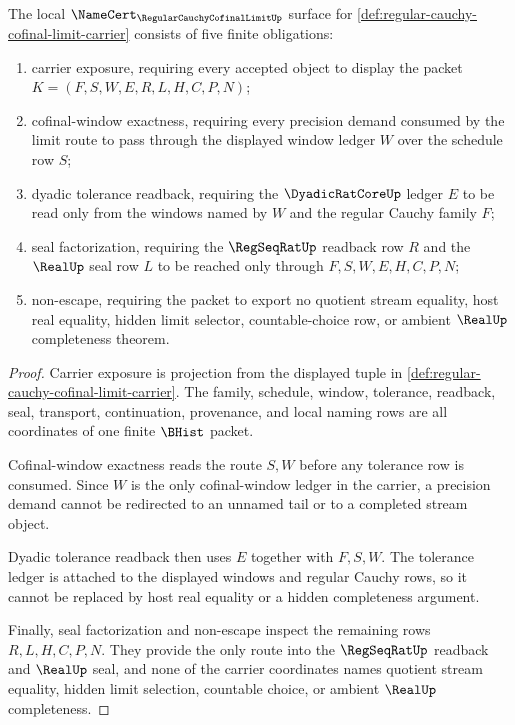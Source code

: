 \begin{theorem}
\label{thm:regular-cauchy-cofinal-limit-namecert-obligations}
The local $\NameCert_{\RegularCauchyCofinalLimitUp}$ surface for \autoref{def:regular-cauchy-cofinal-limit-carrier} consists of five finite obligations:
\begin{enumerate}
\item carrier exposure, requiring every accepted object to display the packet $K=(F,S,W,E,R,L,H,C,P,N)$;
\item cofinal-window exactness, requiring every precision demand consumed by the limit route to pass through the displayed window ledger $W$ over the schedule row $S$;
\item dyadic tolerance readback, requiring the $\DyadicRatCoreUp$ ledger $E$ to be read only from the windows named by $W$ and the regular Cauchy family $F$;
\item seal factorization, requiring the $\RegSeqRatUp$ readback row $R$ and the $\RealUp$ seal row $L$ to be reached only through $F,S,W,E,H,C,P,N$;
\item non-escape, requiring the packet to export no quotient stream equality, host real equality, hidden limit selector, countable-choice row, or ambient $\RealUp$ completeness theorem.
\end{enumerate}
\end{theorem}
\begin{proof}
Carrier exposure is projection from the displayed tuple in \autoref{def:regular-cauchy-cofinal-limit-carrier}. The family, schedule, window, tolerance, readback, seal, transport, continuation, provenance, and local naming rows are all coordinates of one finite $\BHist$ packet.

Cofinal-window exactness reads the route $S,W$ before any tolerance row is consumed. Since $W$ is the only cofinal-window ledger in the carrier, a precision demand cannot be redirected to an unnamed tail or to a completed stream object.

Dyadic tolerance readback then uses $E$ together with $F,S,W$. The tolerance ledger is attached to the displayed windows and regular Cauchy rows, so it cannot be replaced by host real equality or a hidden completeness argument.

Finally, seal factorization and non-escape inspect the remaining rows $R,L,H,C,P,N$. They provide the only route into the $\RegSeqRatUp$ readback and $\RealUp$ seal, and none of the carrier coordinates names quotient stream equality, hidden limit selection, countable choice, or ambient $\RealUp$ completeness.
\end{proof}


